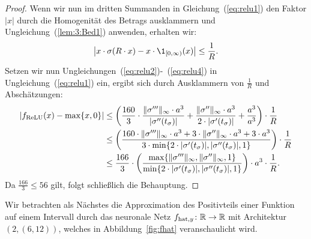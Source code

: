 \begin{proof}
Wenn wir nun im dritten Summanden in Gleichung~(\ref{eq:relu1}) den Faktor $|x|$ durch die Homogenität des Betrags ausklammern und Ungleichung~(\ref{lem:3:Bed1}) anwenden, erhalten wir:
\begin{equation}
\label{eq:relu4}
\big| x \cdot \sigma(R \cdot x) - x \cdot \1_{[0, \infty)}(x)\big| \leq \frac{1}{R}.
\end{equation}
Setzen wir nun Ungleichungen~(\ref{eq:relu2})-~(\ref{eq:relu4}) in Ungleichung~(\ref{eq:relu1}) ein, ergibt sich durch Ausklammern von $\frac{1}{R}$ und Abschätzungen:
\begin{equation*}
\begin{split}
|f_{\mathrm{ReLU}}(x) - \max\{x, 0\}| & \leq \bigg(\frac{160}{3} \cdot \frac{\|\sigma'''\|_{\infty} \cdot a ^3}{|\sigma''(t_{\sigma})|} + \frac{\|\sigma''\|_{\infty} \cdot a^3}{2 \cdot |\sigma'(t_{\sigma})|} + \frac{a^3}{a^3} \bigg) \cdot \frac{1}{R} \\ 
& \leq \bigg(\frac{160 \cdot\|\sigma'''\|_{\infty} \cdot a ^3 + 3 \cdot \|\sigma''\|_{\infty} \cdot a^3 + 3 \cdot a^3}{3 \cdot \min\{ 2 \cdot |\sigma'(t_{\sigma})|, |\sigma''(t_{\sigma})|, 1\}}\bigg) \cdot \frac{1}{R}\\
& \leq \frac{166}{3} \cdot \bigg(\frac{\max\{\|\sigma'''\|_{\infty}, \|\sigma''\|_{\infty} , 1\}}{\min\{ 2 \cdot |\sigma'(t_{\sigma})|, |\sigma''(t_{\sigma})|, 1\}}\bigg) \cdot a^3 \cdot  \frac{1}{R}.
\end{split}
\end{equation*}
Da $\frac{166}{3} \leq 56$ gilt, folgt schließlich die Behauptung.
  \end{proof}
Wir betrachten als Nächstes die Approximation des Positivteils einer Funktion auf einem Intervall durch das neuronale Netz $f_{\mathrm{hat},y}\colon \mathbb{R} \to \mathbb{R}$ mit Architektur $(2, (6, 12))$, welches in Abbildung~\ref{fig:fhat} veranschaulicht wird.
